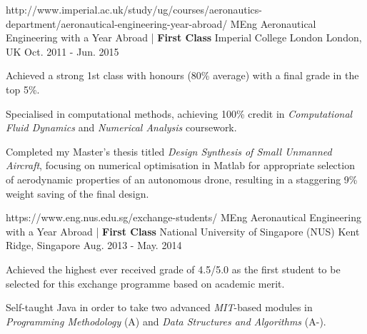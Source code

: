 \begin{cventries}
  \cventry
    {http://www.imperial.ac.uk/study/ug/courses/aeronautics-department/aeronautical-engineering-year-abroad/}
    {MEng Aeronautical Engineering with a Year Abroad | \textbf{First Class}} %
    {Imperial College London} %
    {London, UK} %
    {Oct. 2011 - Jun. 2015} %
    {
      \begin{cvitems} %
        \item {Achieved a strong 1st class with honours (80\% average) with a final grade in the top 5\%.}
        \item {Specialised in computational methods, achieving 100\% credit in \emph{Computational Fluid Dynamics} and \emph{Numerical Analysis} coursework.}
        \item {Completed my Master's thesis titled \emph{Design Synthesis of Small Unmanned Aircraft}, focusing on numerical optimisation in Matlab for appropriate selection of aerodynamic properties of an autonomous drone, resulting in a staggering 9\% weight saving of the final design.}
      \end{cvitems}
    }

  \cventry
    {https://www.eng.nus.edu.sg/exchange-students/}
    {MEng Aeronautical Engineering with a Year Abroad | \textbf{First Class}} %
    {National University of Singapore (NUS)} %
    {Kent Ridge, Singapore} %
    {Aug. 2013 - May. 2014} %
    {
      \begin{cvitems} %
        \item {Achieved the highest ever received grade of 4.5/5.0 as the first student to be selected for this exchange programme based on academic merit.}
        \item {Self-taught Java in order to take two advanced \emph{MIT}-based modules in \emph{Programming Methodology} (A) and \emph{Data Structures and Algorithms} (A-).}
      \end{cvitems}
    }
    
\end{cventries}